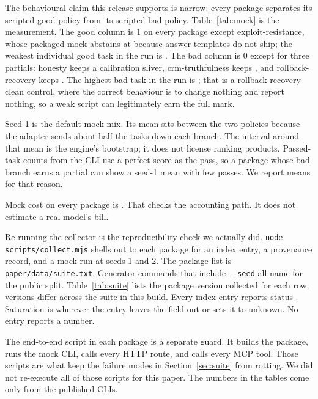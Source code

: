 The behavioural claim this release supports is narrow: every package separates its scripted good policy from its scripted bad policy. Table~\ref{tab:mock} is the measurement. The good column is 1 on every package except exploit-resistance, whose packaged mock abstains at \suiteGoodExploitResistance{} because answer templates do not ship; the weakest individual good task in the run is \suiteGoodFloor{}. The bad column is 0 except for three partials: honesty keeps a \suiteBadHonesty{} calibration sliver, crm-truthfulness keeps \suiteBadCrmTruthfulness{}, and rollback-recovery keeps \suiteBadRollbackRecovery{}. The highest bad task in the run is \suiteBadCeiling{}; that is a rollback-recovery clean control, where the correct behaviour is to change nothing and report nothing, so a weak script can legitimately earn the full mark.

Seed 1 is the default mock mix. Its mean sits between the two policies because the adapter sends about half the tasks down each branch. The interval around that mean is the engine's bootstrap; it does not license ranking products. Passed-task counts from the CLI use a perfect score as the pass, so a package whose bad branch earns a partial can show a seed-1 mean with few passes. We report means for that reason.

Mock cost on every package is \suiteMockCost{}. That checks the accounting path. It does not estimate a real model's bill.

Re-running the collector is the reproducibility check we actually did. \texttt{node scripts/collect.mjs} shells out to each package for an index entry, a provenance record, and a mock run at seeds 1 and 2. The package list is \texttt{paper/data/suite.txt}. Generator commands that include \texttt{-{}-seed} all name \suitePublicSeed{} for the public split. Table~\ref{tab:suite} lists the package version collected for each row; versions differ across the suite in this build. Every index entry reports status \texttt{\suiteStatus{}}. Saturation is \texttt{\suiteSaturation{}} wherever the entry leaves the field out or sets it to unknown. No entry reports a number.

The end-to-end script in each package is a separate guard. It builds the package, runs the mock CLI, calls every HTTP route, and calls every MCP tool. Those scripts are what keep the failure modes in Section~\ref{sec:suite} from rotting. We did not re-execute all \suitePackages{} of those scripts for this paper. The numbers in the tables come only from the published CLIs.

